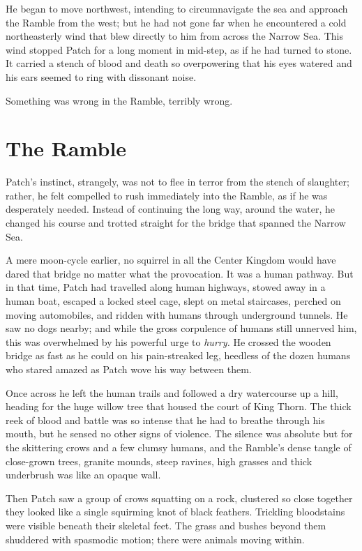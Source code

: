 \documentclass[ebook,oneside,openany,12pt]{memoir}
\begin{document}
He began to move northwest, intending to circumnavigate the sea and
approach the Ramble from the west; but he had not gone far when he
encountered a cold northeasterly wind that blew directly to him from
across the Narrow Sea. This wind stopped Patch for a long moment in
mid-step, as if he had turned to stone. It carried a stench of blood
and death so overpowering that his eyes watered and his ears seemed to
ring with dissonant noise.

Something was wrong in the Ramble, terribly wrong.


\section{The Ramble}

Patch’s instinct, strangely, was not to flee in terror from the stench
of slaughter; rather, he felt compelled to rush immediately into the
Ramble, as if he was desperately needed. Instead of continuing the
long way, around the water, he changed his course and trotted straight
for the bridge that spanned the Narrow Sea.

A mere moon-cycle earlier, no squirrel in all the Center Kingdom would
have dared that bridge no matter what the provocation. It was a human
pathway. But in that time, Patch had travelled along human highways,
stowed away in a human boat, escaped a locked steel cage, slept on
metal staircases, perched on moving automobiles, and ridden with
humans through underground tunnels. He saw no dogs nearby; and while
the gross corpulence of humans still unnerved him, this was
overwhelmed by his powerful urge to \emph{hurry.} He crossed the
wooden bridge as fast as he could on his pain-streaked leg, heedless
of the dozen humans who stared amazed as Patch wove his way between
them.

Once across he left the human trails and followed a dry watercourse up
a hill, heading for the huge willow tree that housed the court of King
Thorn. The thick reek of blood and battle was so intense that he had
to breathe through his mouth, but he sensed no other signs of
violence. The silence was absolute but for the skittering crows and a
few clumsy humans, and the Ramble’s dense tangle of close-grown trees,
granite mounds, steep ravines, high grasses and thick underbrush was
like an opaque wall.

Then Patch saw a group of crows squatting on a rock, clustered so
close together they looked like a single squirming knot of black
feathers. Trickling bloodstains were visible beneath their skeletal
feet. The grass and bushes beyond them shuddered with spasmodic
motion; there were animals moving within.
\end{document}
